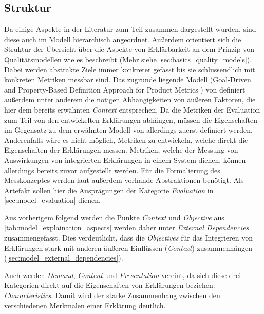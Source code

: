 \subsection{Struktur}

Da einige Aspekte in der Literatur zum Teil zusammen dargestellt wurden, sind diese auch im Modell hierarchisch angeordnet. Außerdem orientiert sich die Struktur der Übersicht über die Aspekte von Erklärbarkeit an dem Prinzip von Qualitätsmodellen wie es \citeauthor{schneider2012abenteuer} beschreibt \cite{schneider2012abenteuer} (Mehr siehe \autoref{sec:basics_quality_models}). Dabei werden abstrakte Ziele immer konkreter gefasst bis sie schlussendlich mit konkreten Metriken messbar sind. Das zugrunde liegende Modell (\glqq Goal-Driven and Property-Based Definition Approach for Product Metrics\grqq{} \cite{briand1995goal}) von \citeauthor{briand1995goal} definiert außerdem unter anderem die nötigen Abhängigkeiten von äußeren Faktoren, die hier dem bereits erwähnten \textit{Context} entsprechen. Da die Metriken der Evaluation zum Teil von den entwickelten Erklärungen abhängen, müssen die Eigenschaften im Gegensatz zu dem erwähnten Modell von \citeauthor{schneider2012abenteuer} allerdings zuerst definiert werden. Anderenfalls wäre es nicht möglich, Metriken zu entwickeln, welche direkt die Eigenschaften der Erklärungen messen. Metriken, welche der Messung von Auswirkungen von integrierten Erklärungen in einem System dienen, können allerdings bereits zuvor aufgestellt werden. Für die Formalierung des Messkonzeptes werden laut \citeauthor{briand1995goal} außerdem vorhande Abstraktionen benötigt. Als Artefakt sollen hier die Ausprägungen der Kategorie \textit{Evaluation} in \autoref{sec:model_evaluation} dienen.

\smallbreak

Aus vorherigem folgend werden die Punkte \textit{Context} und \textit{Objective} aus \autoref{tab:model_explaination_aspects} werden daher unter \textit{External Dependencies} zusammengefasst. Dies verdeutlicht, dass die \textit{Objectives} für das Integrieren von Erklärungen stark mit anderen äußeren Einflüssen (\textit{Context}) zusammenhängen (\autoref{sec:model_external_dependencies}).

Auch werden \textit{Demand}, \textit{Content} und \textit{Presentation} vereint, da sich diese drei Kategorien direkt auf die Eigenschaften von Erklärungen beziehen: \textit{Characteristics}. Damit wird der starke Zusammenhang zwischen den verschiedenen Merkmalen einer Erklärung deutlich.

